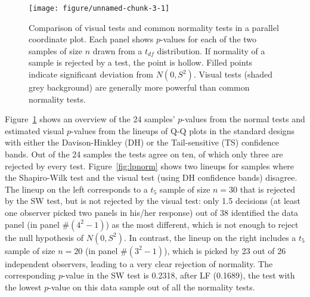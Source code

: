 \documentclass[12pt]{article}\usepackage[]{graphicx}\usepackage[]{color}
\newenvironment{knitrout}{}{} %
\newcommand{\hh}[1]{{\color{magenta} #1}}
\begin{document}
\begin{figure}
\centering
\begin{knitrout}
\color{fgcolor}
\texttt{[image: figure/unnamed-chunk-3-1]} 

\end{knitrout}
\caption{\label{fig:pvals} Comparison of visual tests and common normality tests \hh{in a parallel coordinate plot}. Each panel shows $p$-values  for each of  the two samples of size $n$ drawn from a $t_{df}$ distribution. If normality of a sample is rejected by a test, the point is hollow. Filled points indicate significant deviation from $N(0, S^2)$. Visual tests (shaded grey background) are generally  more powerful than common normality tests.}
\end{figure}
\afterpage{\clearpage}
Figure~\ref{fig:pvals} shows an overview of the 24 samples' $p$-values  from the normal tests and estimated visual $p$-values from the lineups of Q-Q plots in the standard designs with either the Davison-Hinkley (DH) or the Tail-sensitive (TS) confidence bands. Out of the 24 samples the tests agree on ten, of which only three are rejected by every test. 
Figure~\ref{fig:lpnorm} shows two lineups for samples where the Shapiro-Wilk test and the visual test (using DH confidence bands) disagree. 
The lineup on the left corresponds to a $t_5$ sample of size $n = 30$ that is rejected by the SW test, but is not rejected by the visual test: only 1.5 decisions (at least one observer picked two panels in his/her response) out of 38 identified the data panel (in panel \#$(4^2-1)$) as the most different, which is not enough to reject the null hypothesis of $N(0, S^2)$. 
In contrast, the  lineup  on the right includes a $t_5$ sample of size $n=20$ (in panel \#$(3^2-1)$), which is picked by 23 out of 26 independent observers, leading to a very clear rejection of normality. 
The corresponding $p$-value in the SW test is 0.2318, after LF (0.1689), the test with the lowest $p$-value on this data sample out of all the normality tests.
\end{document}

